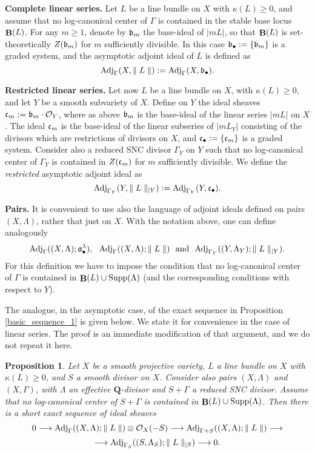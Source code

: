 \documentclass[11pt]{amsart}
\theoremstyle{plain}
\newtheorem{proposition}[theorem]{Proposition}
\theoremstyle{definition}
\newcommand{\QQ}{\mathbf{Q}}
\newcommand{\OO}{\mathcal  {O}}
\newcommand{\fra}{\frak{a}}
\newcommand{\frb}{\frak{b}}
\newcommand{\frc}{\frak{c}}
\newcommand{\Adj}{{\rm Adj}}
\DeclareMathOperator{\BB}{{\bf B}}
\begin{document}
\noindent
{\bf Complete linear series.}
Let $L$ be a line bundle on $X$ with $\kappa(L) \ge 0$, and assume that no log-canonical center of $\Gamma$ is contained in the stable base locus $\BB(L)$. For any $m \ge 1$, denote  by $\frb_m$ the base-ideal of $|mL|$, so that $\BB(L)$ is set-theoretically $Z(\frb_m)$ for $m$ sufficiently divisible. In this case $\frb_{\bullet} := \{\frb_m\}$ is a graded system, and the asymptotic adjoint ideal of $L$ is defined as 
$$\Adj_{\Gamma} (X, \parallel L\parallel) := \Adj_{\Gamma} (X, \frb_{\bullet}).$$


\noindent
{\bf Restricted linear series.}
Let now $L$ be a line bundle on $X$, with $\kappa(L) \ge 0$, and let $Y$ be a smooth 
subvariety of $X$. Define on $Y$ the ideal sheaves $\frc_m : = \frb_m\cdot \OO_Y$, where as above $\frb_m$ is the base-ideal of the linear series $|mL|$ on $X$. The ideal $\frc_m$ is the base-ideal of the linear subseries of $|mL_Y|$ consisting of  the divisors which are restrictions of divisors on $X$, and 
$\frc_{\bullet} : = \{\frc_m\}$ is a graded system. Consider also a reduced SNC divisor $\Gamma_Y$ on $Y$ such that no log-canonical center of $\Gamma_Y$ is contained in $Z(\frc_m)$ for $m$ sufficiently divisible.
We define the \emph{restricted} asymptotic adjoint ideal as 
$$\Adj_{\Gamma_Y} (Y,  \parallel L\parallel_{|Y}) := \Adj_{\Gamma_Y} (Y, \frc_{\bullet}).$$


\noindent
{\bf Pairs.} 
It is convenient to use also the language of adjoint ideals defined on pairs $(X, \Lambda)$,
rather that just on $X$. With the notation above, one can define analogously
$$\Adj_{\Gamma} ((X, \Lambda); \fra_{\bullet}^{\lambda}), ~~
\Adj_{\Gamma} ((X,\Lambda); \parallel L\parallel) 
 {\rm~~and~~} \Adj_{\Gamma_Y} ((Y,\Lambda_Y); \parallel L\parallel_{|Y}) .$$
For this definition we have to impose the condition that 
no log-canonical center of $\Gamma$ is contained in $\BB(L) \cup {\rm Supp}(\Lambda)$ (and the corresponding conditions with respect to $Y$).

\medskip 

The analogue, in the asymptotic case, of the exact sequence in Proposition \ref{basic_sequence_1} is given below. We state it for convenience in the case of linear series. The proof is an immediate modification of that argument, and we do not repeat it here.

\begin{proposition}\label{basic_sequence_2}
Let $X$ be a smooth projective variety, $L$ a line bundle on $X$ with $\kappa(L) \ge 0$, and $S$ a smooth divisor on $X$. Consider also pairs $(X, \Lambda)$ and $(X, \Gamma)$, with $\Lambda$ an effective $\QQ$-divisor and $S + \Gamma$ a reduced SNC divisor. Assume that no log-canonical center of $S + \Gamma$ is contained in $\BB(L) \cup 
{\rm Supp}(\Lambda)$. Then there is a short exact sequence of ideal sheaves
$$0 \longrightarrow \Adj_{\Gamma} ((X, \Lambda); \parallel L \parallel) \otimes \OO_X(-S) \longrightarrow 
\Adj_{\Gamma+ S} ((X, \Lambda); \parallel L \parallel) \longrightarrow $$
$$\longrightarrow 
\Adj_{\Gamma_S} ((S, \Lambda_S); \parallel L \parallel_{|S})\longrightarrow 0.$$
\end{proposition}
\end{document}
